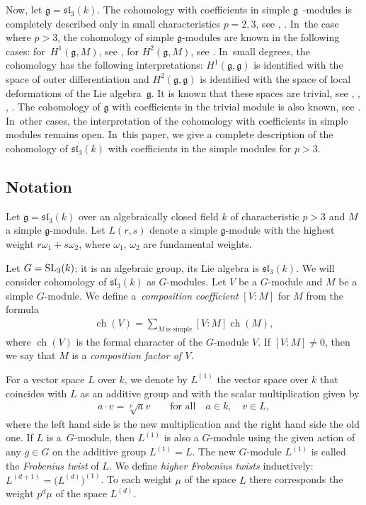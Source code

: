 \documentclass[pdftex]{sigma}%
\numberwithin{equation}{section}
\begin{document}
Now, let $\mathfrak{g}=\mathfrak{sl}_3(k)$. The cohomology with coefficients in simple $\mathfrak{g}$~-modules is completely described only in small characteristics $p=2,3$, see \cite[Theorem~1]{IT21}, \cite[Theorem~1]{IIE21}. In~the case where $p>3$, the cohomology of simple $\mathfrak{g}$-mo\-dules are known in the following cases: for~$H^1(\mathfrak{g},M)$, see \cite[p.~301]{Jan91}, for $H^2(\mathfrak{g},M)$, see \cite[Theorem~1.1]{DI02}. In~small degrees, the cohomology has the following interpretations: $H^1({\mathfrak{g}},{\mathfrak{g}})$ is identified with the space of outer differentiation and $H^2({\mathfrak{g}},{\mathfrak{g}})$ is identified with the space of local deformations of the Lie algebra~$\mathfrak{g}$. It is known that these spaces are trivial, see \cite[p.~124]{Perm05}, \cite[p.~125]{Che05}, \cite[Lemma~2.2.1b]{BGLL}, \cite[p.~32]{BGL}. The cohomology of ${\mathfrak{g}}$ with coefficients in the trivial module is also known, see \cite[p.~42]{BGL}. In~other cases, the interpretation of the cohomology with coefficients in simple modules remains open. In~this paper, we give a complete description of the cohomology of $\mathfrak{sl}_3(k)$ with coefficients in the simple modules for $p>3$.

\subsection{Notation}%
Let $\mathfrak{g}=\mathfrak{sl}_3(k)$ over an
algebraically closed field $k$ of characteristic
$p>3$ and $M$ a simple $\mathfrak{g}$-mo\-dule. Let $L(r,s)$ denote a simple $\mathfrak{g}$-module with the highest weight
$r\omega_1+s\omega_2$, where $\omega_1$, $\omega_2$ are fundamental weights.

Let $G={\rm SL}_3(k)$; it is an algebraic group, its Lie algebra is $\mathfrak{sl}_3(k)$. We will consider cohomology of $\mathfrak{sl}_3(k)$ as $G$-modules. Let $V$ be a $G$-module and $M$ be a simple $G$-module. We define a~{\it composition coefficient} $[V:M]$ for $M$ from the formula
\begin{gather*}
\operatorname{ch}(V)=\sum_{M \ \text{is simple}}[V:M]\operatorname{ch}(M),
\end{gather*}
where $\operatorname{ch}(V)$ is the formal character of the $G$-module $V$.
If $[V:M]\neq 0$, then we say that $M$ is a {\it composition factor of $V$.}

For a vector space $L$ over $k$, we denote by $L^{(1)}$ the vector space over $k$ that coincides with $L$ as an additive group and with the scalar multiplication given by
\begin{gather*}
a\cdot v=\sqrt[p]{a}v\qquad\text{for all}\quad a\in k, \quad v\in L,
\end{gather*}
where the left hand side is the new multiplication and the right hand side the old one. If $L$ is a~$G$-module, then $L^{(1)}$ is also a
$G$-module using the given action of any $g\in G$ on the additive group $L^{(1)}=L$. The new $G$-module $L^{(1)}$ is called the {\it Frobenius twist} of $L$. We define {\it higher Frobenius twists} inductively:
$L^{(d+1)}=\big(L^{(d)}\big)^{(1)}$. To each weight $\mu$ of the space $L$ there corresponds the weight $p^d\mu$ of the space $L^{(d)}$.
\end{document}
